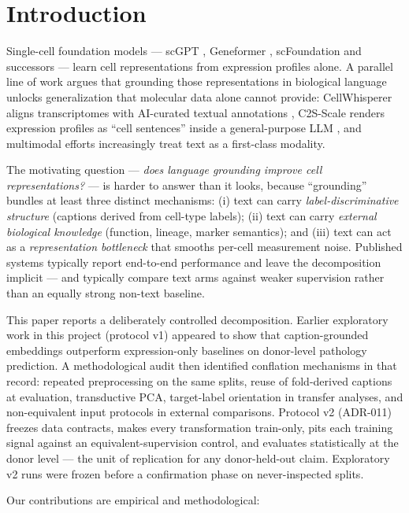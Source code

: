 \documentclass[11pt]{article}
\begin{document}
\section{Introduction}

Single-cell foundation models --- scGPT \citep{scgpt}, Geneformer
\citep{geneformer}, scFoundation \citep{scfoundation} and successors ---
learn cell representations from expression profiles alone. A parallel line
of work argues that grounding those representations in biological language
unlocks generalization that molecular data alone cannot provide:
CellWhisperer aligns transcriptomes with AI-curated textual annotations
\citep{cellwhisperer}, C2S-Scale renders expression profiles as ``cell
sentences'' inside a general-purpose LLM \citep{c2sscale}, and multimodal
efforts increasingly treat text as a first-class modality.

The motivating question --- \emph{does language grounding improve cell
representations?} --- is harder to answer than it looks, because
``grounding'' bundles at least three distinct mechanisms: (i) text can
carry \emph{label-discriminative structure} (captions derived from
cell-type labels); (ii) text can carry \emph{external biological
knowledge} (function, lineage, marker semantics); and (iii) text can act
as a \emph{representation bottleneck} that smooths per-cell measurement
noise. Published systems typically report end-to-end performance and leave
the decomposition implicit --- and typically compare text arms against
weaker supervision rather than an equally strong non-text baseline.

This paper reports a deliberately controlled decomposition. Earlier
exploratory work in this project (protocol v1) appeared to show that
caption-grounded embeddings outperform expression-only baselines on
donor-level pathology prediction. A methodological audit then identified
conflation mechanisms in that record: repeated preprocessing on the same
splits, reuse of fold-derived captions at evaluation, transductive PCA,
target-label orientation in transfer analyses, and non-equivalent input
protocols in external comparisons. Protocol v2 (ADR-011) freezes data
contracts, makes every transformation train-only, pits each training
signal against an equivalent-supervision control, and evaluates
statistically at the donor level --- the unit of replication for any
donor-held-out claim. Exploratory v2 runs were frozen before a
confirmation phase on never-inspected splits.

Our contributions are empirical and methodological:
\end{document}

